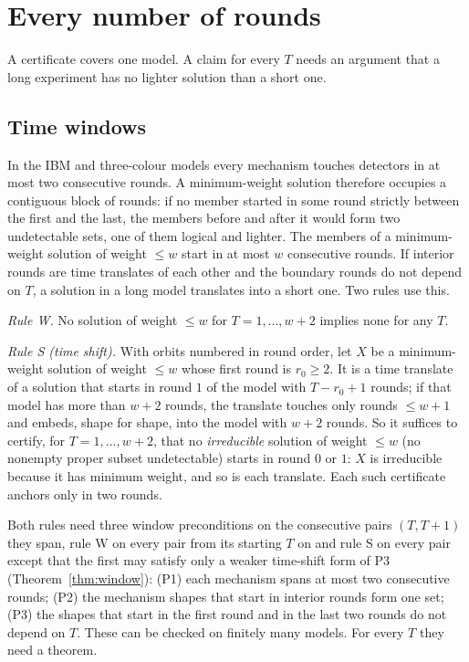 \documentclass[aps,pra,twocolumn,superscriptaddress,nofootinbib,longbibliography,floatfix]{revtex4-2}
\begin{document}
\section{Every number of rounds}
\label{sec:everyT}

A certificate covers one model. A claim for every $T$ needs an argument that a long experiment has no lighter solution than a short one.

\subsection{Time windows}
\label{sec:windows}

In the IBM and three-colour models every mechanism touches detectors in at most two consecutive rounds. A minimum-weight solution therefore occupies a contiguous block of rounds: if no member started in some round strictly between the first and the last, the members before and after it would form two undetectable sets, one of them logical and lighter. The members of a minimum-weight solution of weight $\le w$ start in at most $w$ consecutive rounds. If interior rounds are time translates of each other and the boundary rounds do not depend on $T$, a solution in a long model translates into a short one. Two rules use this.

\emph{Rule W.} No solution of weight $\le w$ for $T=1,\dots,w+2$ implies none for any $T$.

\emph{Rule S (time shift).} With orbits numbered in round order, let $X$ be a minimum-weight solution of weight $\le w$ whose first round is $r_0\ge2$. It is a time translate of a solution that starts in round $1$ of the model with $T-r_0+1$ rounds; if that model has more than $w+2$ rounds, the translate touches only rounds $\le w+1$ and embeds, shape for shape, into the model with $w+2$ rounds. So it suffices to certify, for $T=1,\dots,w+2$, that no \emph{irreducible} solution of weight $\le w$ (no nonempty proper subset undetectable) starts in round $0$ or $1$: $X$ is irreducible because it has minimum weight, and so is each translate. Each such certificate anchors only in two rounds.

Both rules need three window preconditions on the consecutive pairs $(T,T+1)$ they span, rule W on every pair from its starting $T$ on and rule S on every pair except that the first may satisfy only a weaker time-shift form of P3 (Theorem~\ref{thm:window}): (P1) each mechanism spans at most two consecutive rounds; (P2) the mechanism shapes that start in interior rounds form one set; (P3) the shapes that start in the first round and in the last two rounds do not depend on $T$. These can be checked on finitely many models. For every $T$ they need a theorem.
\end{document}
